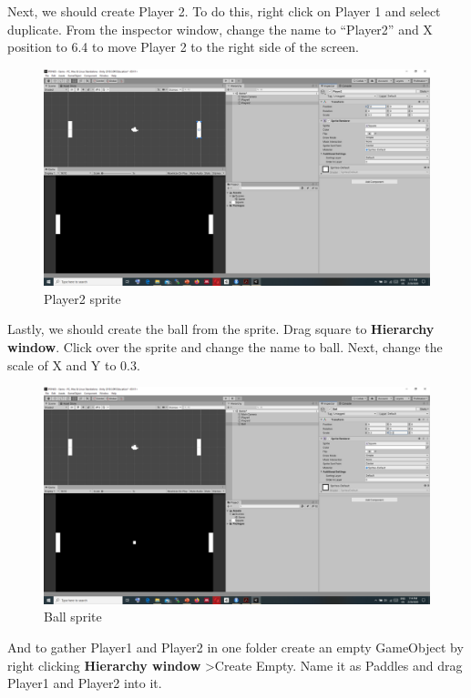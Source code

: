 \documentclass[
]{book}
\begin{document}
Next, we should create Player 2. To do this, right click on Player 1 and select duplicate. From the inspector window, change the name to ``Player2'' and X position to 6.4 to move Player 2 to the right side of the screen.

\begin{figure}
\centering
\includegraphics{Images/Player2.png}
\caption{Player2 sprite}
\end{figure}

Lastly, we should create the ball from the sprite. Drag square to \textbf{Hierarchy window}. Click over the sprite and change the name to ball. Next, change the scale of X and Y to 0.3.

\begin{figure}
\centering
\includegraphics{Images/Ball.png}
\caption{Ball sprite}
\end{figure}

And to gather Player1 and Player2 in one folder create an empty GameObject by right clicking \textbf{Hierarchy window} \textgreater Create Empty.
Name it as Paddles and drag Player1 and Player2 into it.
\end{document}
